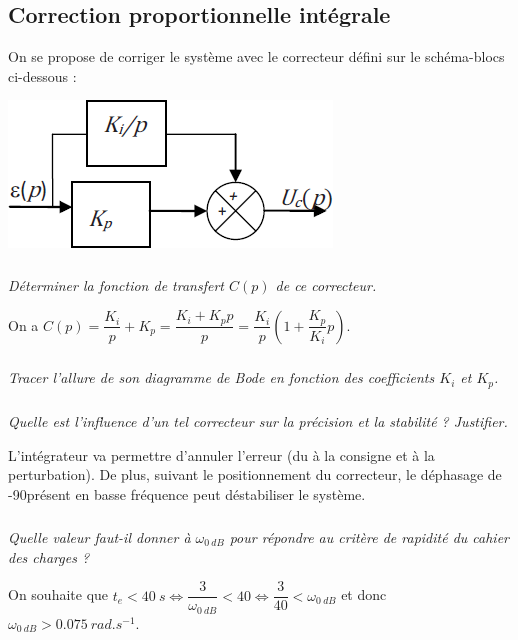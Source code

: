 \documentclass[10pt,fleqn]{article} %
\begin{document}
\begin{multicols}{2}
\else
\fi

\subsection*{Correction proportionnelle intégrale}
On se propose de corriger le système avec le correcteur défini sur le schéma-blocs ci-dessous :
\begin{center}
\includegraphics[width=.4\linewidth]{images/fig_07}
\end{center}


\subparagraph{}
\textit{Déterminer la fonction de transfert $C(p)$ de ce correcteur.}
\ifprof
\begin{corrige}
On a $C(p)=\dfrac{K_i}{p}+K_p = \dfrac{K_i+K_p p}{p}= \dfrac{K_i}{p}\left(1+\dfrac{K_p}{K_i} p\right)$.
\end{corrige}
\else
\fi

\ifprof
\newpage
\else
\fi


\subparagraph{}
\textit{Tracer l’allure de son diagramme de Bode en fonction des coefficients $K_i$ et $K_p$.}
\ifprof
\begin{corrige}

\end{corrige}
\else
\fi

\subparagraph{}
\textit{Quelle est l’influence d’un tel correcteur sur la précision et la stabilité ? Justifier.}
\ifprof
\begin{corrige}
L'intégrateur va permettre d'annuler l'erreur (du à la consigne et à la perturbation).
De plus, suivant le positionnement du correcteur, le déphasage de -90\degres présent en basse fréquence peut déstabiliser le système.
\end{corrige}
\else
\fi

\subparagraph{}
\textit{Quelle valeur faut-il donner à $\omega_{\SI{0}{dB}}$ pour répondre au critère de rapidité du cahier des charges ?}
\ifprof
\begin{corrige}
On souhaite que $t_e<\SI{40}{s} \Leftrightarrow \dfrac{3}{\omega_{\SI{0}{dB}}}<40 \Leftrightarrow \dfrac{3}{40}<\omega_{\SI{0}{dB}}$ et donc $\omega_{\SI{0}{dB}}>\SI{0,075}{rad.s^{-1}}$.
\end{corrige}
\else
\fi


\end{multicols}
\end{document}
